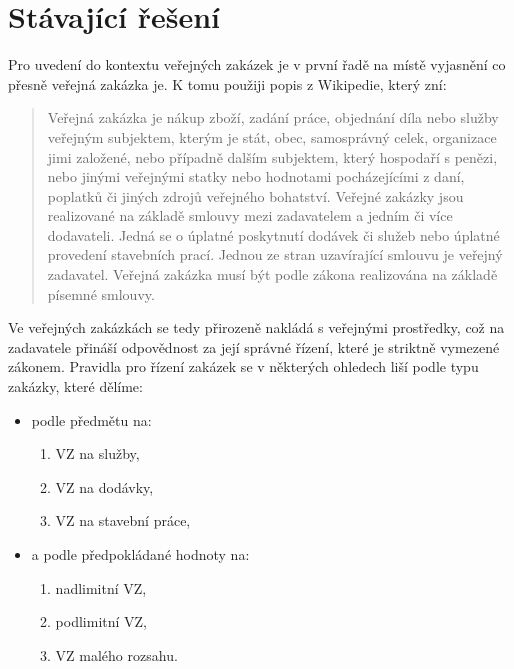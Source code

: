 \documentclass[thesis=M,czech]{FITthesis}[2019/12/23]
\begin{document}
\chapter{Stávající řešení}

Pro uvedení do kontextu veřejných zakázek je v první řadě na místě vyjasnění co přesně veřejná zakázka je. K tomu použiji popis z Wikipedie\cite{wikiPC}, který zní:
\begin{quote}
    Veřejná zakázka je nákup zboží, zadání práce, objednání díla nebo služby veřejným subjektem, kterým je stát, obec, samosprávný celek, organizace jimi založené, nebo případně dalším subjektem, který hospodaří s penězi, nebo jinými veřejnými statky nebo hodnotami pocházejícími z daní, poplatků či jiných zdrojů veřejného bohatství. Veřejné zakázky jsou realizované na základě smlouvy mezi zadavatelem a jedním či více dodavateli. Jedná se o úplatné poskytnutí dodávek či služeb nebo úplatné provedení stavebních prací. Jednou ze stran uzavírající smlouvu je veřejný zadavatel. Veřejná zakázka musí být podle zákona realizována na základě písemné smlouvy. 
\end{quote}

Ve veřejných zakázkách se tedy přirozeně nakládá s veřejnými prostředky, což na zadavatele přináší odpovědnost za její správné řízení, které je striktně vymezené zákonem. Pravidla pro řízení zakázek se v některých ohledech liší podle typu zakázky, které dělíme:
\begin{itemize}
    \item podle předmětu na:
    \begin{enumerate}
        \item VZ na služby,
        \item VZ na dodávky,
        \item VZ na stavební práce,
    \end{enumerate}
    \item a podle předpokládané hodnoty na:
    \begin{enumerate}
        \item nadlimitní VZ,
        \item podlimitní VZ,
        \item VZ malého rozsahu.
    \end{enumerate}
\end{itemize}

\end{document}
